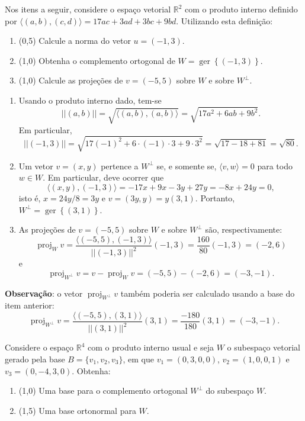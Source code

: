 \documentclass[12pt,a4paper]{article}
\newcommand{\norm}[1]{\left|\left|{#1}\right|\right|}
\newcommand*\ger[1]{\operatorname{ger}\left\{#1\right\}}
\newcommand*\proj{\operatorname{proj}}
\newcommand*\R{\mathbb{R}}
\begin{document}
\begin{ExerciseList}
\Exercise[title={2,5}] Nos itens a seguir, considere o espaço vetorial $\R^2$ com o produto interno definido por $\langle (a, b), (c, d) \rangle = 17ac + 3ad + 3bc + 9bd$. Utilizando esta definição:
\begin{enumerate}
\item (0,5) Calcule a norma do vetor $u=(-1,3)$.
\item (1,0) Obtenha o complemento ortogonal de $W = \ger{ (-1,3) }$.
\item (1,0) Calcule as projeções de $v = (-5,5)$ sobre $W$ e sobre $W^\perp$.
\end{enumerate}
\Answer
\begin{enumerate}
\item Usando o produto interno dado, tem-se
\[
\norm{(a,b)}
= \sqrt{ \langle (a, b), (a, b) \rangle }
= \sqrt{ 17 a^2 + 6ab + 9b^2 }.
\]
Em particular,
\[
\norm{(-1,3)}
= \sqrt{ 17 (-1)^2 + 6 \cdot (-1) \cdot 3 + 9 \cdot 3^2 }
= \sqrt{ 17 - 18 + 81 }
= \sqrt{80}.
\]
\item
Um vetor $v = (x,y)$ pertence a $W^\perp$ se, e somente se, $\langle v, w\rangle = 0$ para todo $w \in W$. Em particular, deve ocorrer que
\[
\langle (x, y), (-1, 3) \rangle = -17x + 9x -3y + 27y = -8x+24y = 0,
\]
isto é, $x=24y/8 = 3y$ e $v = (3y,y) = y(3,1)$. Portanto, $W^\perp = \ger{ (3,1) }$.
\item As projeções de $v = (-5,5)$ sobre $W$ e sobre $W^\perp$ são, respectivamente:
\[
\proj_W v
= \frac{\langle (-5,5), (-1,3) \rangle}{\norm{(-1,3)}^2}(-1,3)
= \frac{160}{80}(-1,3)
= (-2,6)
\]
e
\[
\proj_{W^\perp} v
= v - \proj_W v
= (-5,5) - (-2,6)
= (-3,-1).
\]
\end{enumerate}

\textbf{Observação}: o vetor $\proj_{W^\perp} v$ também poderia ser calculado usando a base do item anterior:
\[
\proj_{W^\perp} v
= \frac{\langle (-5,5), (3,1) \rangle}{\norm{(3,1)}^2}(3,1)
= \frac{-180}{180}(3,1)
= (-3,-1).
\]


\Exercise[title={2,5}] Considere o espaço $\R^4$ com o produto interno usual e seja $W$ o subespaço vetorial gerado pela base $B = \{ v_1, v_2, v_3\}$, em que $v_1 = (0,3,0,0)$, $v_2 = (1,0,0,1)$ e $v_3 = (0,-4,3,0)$. Obtenha:
\begin{enumerate}
\item (1,0) Uma base para o complemento ortogonal $W^\perp$ do subespaço $W$.
\item (1,5) Uma base ortonormal para $W$.
\end{enumerate}
\Answer


\end{ExerciseList}
\end{document}
